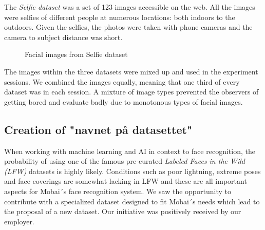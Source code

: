 \noindent The \textit{Selfie dataset} was a set of 123 images accessible on the web. All the images were selfies of different people at numerous locations: both indoors to the outdoors. Given the selfies, the photos were taken with phone cameras and the camera to subject distance was short. 
\begin{figure}[h]
    \centering
    \qquad
    \caption{Facial images from Selfie dataset}
    \label{fig:selfie_dataset}
\end{figure}

\noindent The images within the three datasets were mixed up and used in the experiment sessions. We combined the images equally, meaning that one third of every dataset was in each session. A mixture of image types prevented the observers of getting bored and evaluate badly due to monotonous types of facial images. 


\subsection{Creation of "navnet på datasettet"}
\label{sec:ownData}
When working with machine learning and AI in context to face recognition, the probability of using one of the famous pre-curated \textit{Labeled Faces in the Wild (LFW)} datasets is highly likely. Conditions such as poor lightning, extreme poses and face coverings are somewhat lacking in LFW and these are all important aspects for Mobai´s face recognition system. We saw the opportunity to contribute with a specialized dataset designed to fit Mobai´s needs which lead to the proposal of a new dataset. Our initiative was positively received by our employer. 

